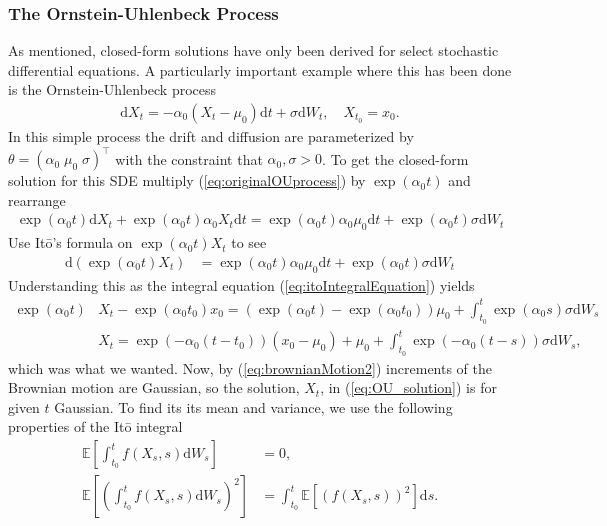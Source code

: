 \subsubsection{The Ornstein-Uhlenbeck Process}
As mentioned, closed-form solutions have only been derived for select stochastic differential equations. A particularly important example where this has been done is the Ornstein-Uhlenbeck process
\begin{align}
    \mathrm{d}X_t = -\alpha_0\left(X_t - \mu_0\right)\mathrm{d}t + \sigma \mathrm{d}W_t, \quad X_{t_0} = x_0. \label{eq:originalOUprocess}
\end{align}
In this simple process the drift and diffusion are parameterized by $\theta = \left(\alpha_0\; \mu_0\; \sigma\right)^\top$ with the constraint that $\alpha_0, \sigma>0$.
To get the closed-form solution for this SDE multiply (\ref{eq:originalOUprocess}) by $\exp\left(\alpha_0 t\right)$ and rearrange
\begin{align}
    \exp\left(\alpha_0 t\right)\mathrm{d}X_t + \exp\left(\alpha_0 t\right) \alpha_0 X_t \mathrm{d}t = \exp\left(\alpha_0 t\right)\alpha_0\mu_0 \mathrm{d}t + \exp\left(\alpha_0 t\right)\sigma \mathrm{d}W_t
\end{align}
Use Itō's formula on $\exp\left(\alpha_0 t\right)X_t$ to see
\begin{align}
    \mathrm{d}\left(\exp\left(\alpha_0 t\right)X_t\right) &= \exp\left(\alpha_0 t\right)\alpha_0 \mu_0 \mathrm{d}t + \exp\left(\alpha_0 t\right) \sigma \mathrm{d}W_t 
\end{align}
Understanding this as the integral equation (\ref{eq:itoIntegralEquation}) yields
\begin{align}
    \exp\left(\alpha_0 t\right)&X_t - \exp\left(\alpha_0 t_0\right)x_0 = \left(\exp\left(\alpha_0 t\right) - \exp\left(\alpha_0 t_0\right)\right)\mu_0 + \int_{t_0}^t \exp\left(\alpha_0 s\right)\sigma \mathrm{d}W_s \nonumber \\
    &X_t = \exp\left(-\alpha_0\left(t - t_0\right)\right)\left(x_0 - \mu_0\right) + \mu_0 + \int_{t_0}^t \exp\left(-\alpha_0 \left(t - s\right)\right)\sigma \mathrm{d}W_s \label{eq:OU_solution},
\end{align}
which was what we wanted. Now, by (\ref{eq:brownianMotion2}) increments of the Brownian motion are Gaussian, so the solution, $X_t$, in (\ref{eq:OU_solution}) is for given $t$ Gaussian. To find its its mean and variance, we use the following properties of the Itō integral \cite[theorem 3.2.1 and lemma 3.1.5]{Oksendal2003_yu}
\begin{align}
    \mathbb{E}\left[\int_{t_0}^t f(X_s, s) \mathrm{d}W_s\right] &= 0 \label{eq:meanOfItoIntegral},\\
    \mathbb{E}\left[\left(\int_{t_0}^t f(X_s, s) \mathrm{d}W_s\right)^2\right] &= \int_{t_0}^t \mathbb{E}\left[\left(f(X_s, s)\right)^2\right] \mathrm{d}s. \label{eq:ItoIsometry}
\end{align}
